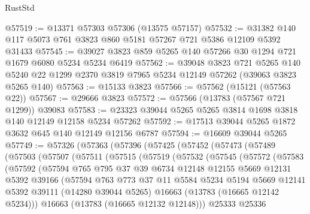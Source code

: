 \begin{lexlean}{RustStd}
\begin{coremodule}
@57519 := @13371 @57303 @57306 (@13575 @57157)
@57532 := @31382 @140 @117 @5073 @761 @3823 @860 @5181 @57267 @721 @5386 @12109 @5392 @31433
@57545 := @39027 @3823 @859 @5265 @140 @57266 @30 @1294 @721 @1679 @6080 @5234 @5234 @6419
@57562 := @39048
    @3823
    @721
    @5265
    @140
    @5240
    @22
    @1299
    @2370
    @3819
    @7965
    @5234
    @12149
    @57262
    (@39063 @3823 @5265 @140)
@57563 := @15133 @3823
@57566 := @57562 (@15121 (@57563 @22))
@57567 := @29666 @3823
@57572 := @57566 (@13783 (@57567 @721 @1299)) @39083
@57583 := @23323 @39044 @5265 @5265 @3814 @1698 @3818 @140 @12149 @12158 @5234 @57262
@57592 := @17513 @39044 @5265 @1872 @3632 @645 @140 @12149 @12156 @6787
@57594 := @16609 @39044 @5265
@57749 := @57326
    (@57363
      (@57396
        (@57425
          (@57452
            (@57473
              (@57489
                (@57503
                  (@57507
                    (@57511
                      (@57515
                        (@57519
                          (@57532
                            (@57545
                              (@57572
                                (@57583
                                  (@57592
                                    (@57594
                                      @765
                                      @795
                                      @37
                                      @39
                                      @6734
                                      @12148
                                      @12155
                                      @5669
                                      @12131
                                      @5392
                                      @39166
                                      (@57594
                                        @763
                                        @773
                                        @37
                                        @11
                                        @5584
                                        @5234
                                        @5194
                                        @5669
                                        @12141
                                        @5392
                                        @39111
                                        (@14280 @39044 @5265)
                                        @16663
                                        (@13783 (@16665 @12142 @5234)))
                                      @16663
                                      (@13783 (@16665 @12132 @12148)))
                                    @25333
                                    @25336

\end{coremodule}
\end{lexlean}
